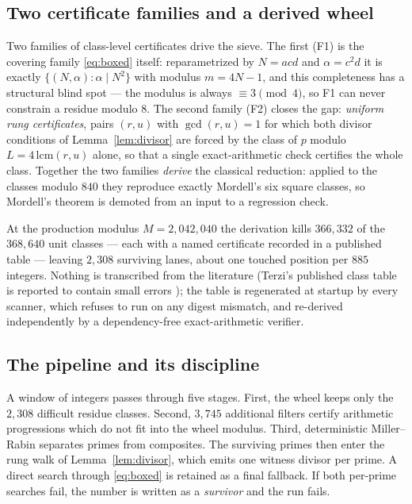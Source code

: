 \documentclass[11pt]{article}
\theoremstyle{definition}
\theoremstyle{remark}
\begin{document}
\subsection{Two certificate families and a derived wheel}\label{sec:wheel}

Two families of class-level certificates drive the sieve. The first (F1) is the
covering family \eqref{eq:boxed} itself: reparametrized by $N = acd$ and
$\alpha = c^2d$ it is exactly $\{(N,\alpha) : \alpha \mid N^2\}$ with modulus
$m = 4N - 1$, and this completeness has a structural blind spot --- the modulus is
always $\equiv 3 \pmod 4$, so F1 can never constrain a residue modulo $8$. The second
family (F2) closes the gap: \emph{uniform rung certificates}, pairs $(r, u)$ with
$\gcd(r,u)=1$ for which both divisor conditions of Lemma~\ref{lem:divisor} are forced
by the class of $p$ modulo $L = 4\,\mathrm{lcm}(r,u)$ alone, so that a single
exact-arithmetic check certifies the whole class. Together the two families
\emph{derive} the classical reduction: applied to the classes modulo $840$ they
reproduce exactly Mordell's six square classes, so Mordell's theorem is demoted from
an input to a regression check.

At the production modulus $M = 2{,}042{,}040$ the derivation kills $366{,}332$ of the
$368{,}640$ unit classes --- each with a named certificate recorded in a published
table --- leaving $2{,}308$ surviving lanes, about one touched position per $885$
integers. Nothing is transcribed from the literature (Terzi's published class table
is reported to contain small errors \cite{ElsholtzPC2026}); the table is regenerated
at startup by every scanner,
which refuses to run on any digest mismatch, and re-derived independently by a
dependency-free exact-arithmetic verifier.

\subsection{The pipeline and its discipline}\label{sec:pipeline}

A window of integers passes through five stages. First, the wheel keeps only the
$2{,}308$ difficult residue classes. Second, $3{,}745$ additional filters certify
arithmetic progressions which do not fit into the wheel modulus. Third, deterministic
Miller--Rabin separates primes from composites. The surviving primes then enter the
rung walk of Lemma~\ref{lem:divisor}, which emits one witness divisor per prime. A
direct search through \eqref{eq:boxed} is retained as a final fallback. If both
per-prime searches fail, the number is written as a \emph{survivor} and the run fails.
\end{document}
